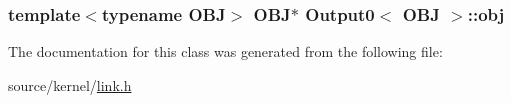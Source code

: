 \hypertarget{classOutput0_2dd51d5df9d69af8c45a0e7512cfbfec}{
\subsubsection[{obj}]{\setlength{\rightskip}{0pt plus 5cm}template$<$typename OBJ$>$ OBJ$\ast$ {\bf Output0}$<$ OBJ $>$::{\bf obj}}}
\label{classOutput0_2dd51d5df9d69af8c45a0e7512cfbfec}




The documentation for this class was generated from the following file:\begin{CompactItemize}
\item 
source/kernel/\hyperlink{link_8h}{link.h}\end{CompactItemize}
